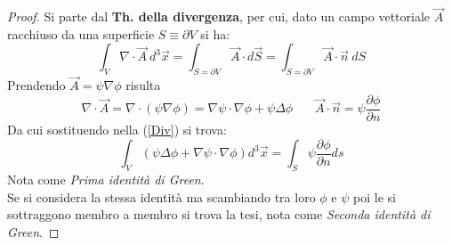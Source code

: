 \documentclass[twoside]{article}
\begin{document}
\begin{proof}
Si parte dal \textbf{Th. della divergenza}, per cui, dato un campo vettoriale $\Vec{A}$ racchiuso da una superficie $S\equiv \partial V$ si ha:
\begin{equation}\label{Div}
    \int_V \nabla \cdot \Vec{A} \ d^3 \Vec{x}=\int_{S=\partial V}\Vec{A}\cdot d\Vec{S}=\int_{S=\partial V}\Vec{A}\cdot \Vec{n} \ dS
\end{equation}
Prendendo $\Vec{A}=\psi \nabla \phi$ risulta
\begin{equation}
    \nabla \cdot \Vec{A}=\nabla \cdot (\psi \nabla \phi)=\nabla \psi \cdot \nabla \phi + \psi \Delta\phi \ \ \ \ \ \ \ \ \Vec{A}\cdot \Vec{n}=\psi \frac{\partial \phi}{\partial n}
\end{equation}
Da cui sostituendo nella (\ref{Div}) si trova:
\begin{equation}
    \int_V (\psi \Delta \phi + \nabla \psi \cdot \nabla \phi ) d^3 \Vec{x}=\int_S \psi \frac{\partial \phi}{\partial n}ds
\end{equation}
Nota come \textit{Prima identità di Green}.
\\
Se si considera la stessa identità ma scambiando tra loro $\phi$ e $\psi$ poi le si sottraggono membro a membro si trova la tesi, nota come \textit{Seconda identità di Green}.

\end{proof}
\end{document}
